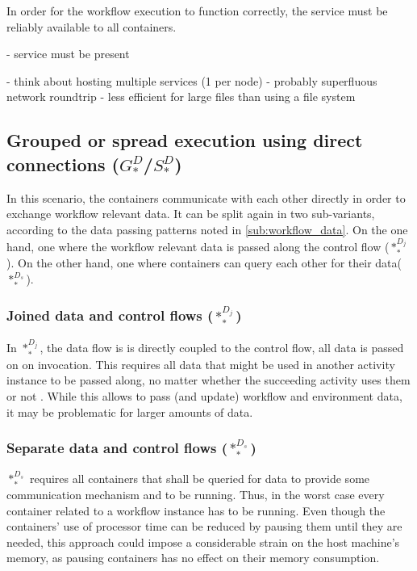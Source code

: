   In order for the workflow execution to function correctly, the service must be reliably available to all containers.

  - service must be present

  - think about hosting multiple services (1 per node)
  - probably superfluous network roundtrip
  - less efficient for large files than using a file system


\subsection[Grouped or spread execution using direct connections]{Grouped or spread execution using direct connections ($G_{*}^{D}$/$S_{*}^{D}$)} %
\label{sub:grouped_execution_using_direct_connections}

  In this scenario, the containers communicate with each other directly in order to exchange workflow relevant data. It can be split again in two sub-variants, according to the data passing patterns noted in \ref{sub:workflow_data}. On the one hand, one where the workflow relevant data is passed along the control flow ($*_{*}^{D_j}$). On the other hand, one where containers can query each other for their data($*_{*}^{D_s}$).

  \subsubsection{Joined data and control flows ($*_{*}^{D_j}$)} %
    In $*_{*}^{D_j}$, the data flow is is directly coupled to the control flow, \ie all data is passed on on invocation. This requires all data that might be used in another activity instance to be passed along, no matter whether the succeeding activity uses them or not \cite{Russell2005Workflow}. While this allows to pass (and update) workflow and environment data, it may be problematic for larger amounts of data.

  \subsubsection{Separate data and control flows ($*_{*}^{D_s}$)} %
    $*_{*}^{D_s}$ requires all containers that shall be queried for data to provide some communication mechanism and to be running. Thus, in the worst case every container related to a workflow instance has to be running. Even though the containers' use of processor time can be reduced by pausing them until they are needed, this approach could impose a considerable strain on the host machine's memory, as pausing containers has no effect on their memory consumption.

